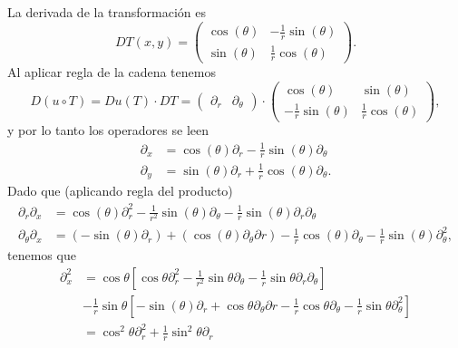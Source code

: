 \begin{Solucion}
\begin{enumerate}[label=(\alph*), topsep=3pt, itemsep=2pt]
	La derivada de la transformación es
	\begin{displaymath}
		DT(x,y)
		=
		\begin{pmatrix}
			\cos(\theta) & -\frac{1}{r} \sin(\theta) \\
			\sin(\theta) & \frac{1}{r} \cos(\theta)
		\end{pmatrix}.
	\end{displaymath}
	Al aplicar regla de la cadena tenemos
	\begin{displaymath}
		D(u\circ T)
		=
		Du(T) \cdot DT
		=
		\begin{pmatrix}
			\partial_{r} & \partial_{\theta}
		\end{pmatrix}
		\cdot
		\begin{pmatrix}
			\cos(\theta) & \sin(\theta)  \\
			-\frac{1}{r} \sin(\theta) & \frac{1}{r} \cos(\theta)
		\end{pmatrix},
	\end{displaymath}
	y por lo tanto los operadores se leen
	\begin{align*}
		\partial_{x} &= 
		\cos(\theta) \partial_{r} - \frac{1}{r} \sin(\theta) \partial_{\theta}
		\\
		\partial_{y} &=
		\sin(\theta) \partial_{r} + \frac{1}{r} \cos(\theta)
		\partial_{\theta}.
	\end{align*}
	Dado que (aplicando regla del producto)
	\begin{align*}
		\partial_{r} \partial_{x}
		&=
		\cos(\theta) \partial_{r}^2 
		- \frac{1}{r^2} \sin(\theta) \partial_{\theta}
		- \frac{1}{r} \sin(\theta) \partial_{r} \partial_{\theta}
		\\
		\partial_{\theta} \partial_{x}
		&=
		(-\sin(\theta) \partial_{r}) + (\cos(\theta) \partial_{\theta} \partial{r}) 
		- \frac{1}{r} \cos(\theta) \partial_{\theta}
		- \frac{1}{r} \sin(\theta) \partial_{\theta}^2,
	\end{align*}
	tenemos que
	\begin{align*}
		\partial_{x}^2 
		&=
		\cos\theta \left[
		\cos\theta \partial_{r}^2 
		- \frac{1}{r^2} \sin\theta \partial_{\theta}
		- \frac{1}{r} \sin\theta \partial_{r} \partial_{\theta}
		\right]
		\\& - \frac{1}{r} \sin\theta
		\left[
			- \sin(\theta) \partial_{r} 
			+ \cos\theta \partial_{\theta} \partial{r}
			- \frac{1}{r} \cos\theta \partial_{\theta}
			- \frac{1}{r} \sin\theta \partial_{\theta}^2
		\right]
		\\&=
		\cos^2 \theta \partial_{r}^2 
		+ \frac{1}{r} \sin^2\theta \partial_{r} 

\end{align*}
\end{enumerate}
\end{Solucion}
